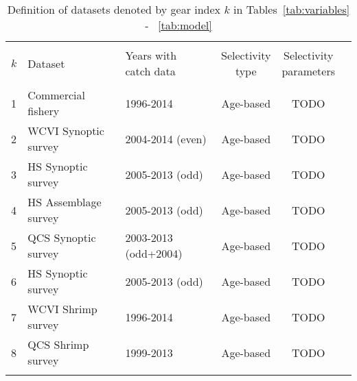 \newp
\begin{table}[b]
\centering
\caption{\label{tab:datasets} Definition of datasets denoted by gear index $k$ in Tables~\ref{tab:variables} - ~\ref{tab:model}}
\begin{tabular}{lllccc}
\hline \\
$k$  & Dataset & \specialcell{Years with\\catch data} & \specialcell{Selectivity\\type} & \specialcell{Selectivity\\parameters} \\   %
\hline \\
1 & Commercial fishery     & 1996-2014             & Age-based & TODO \\
2 & WCVI Synoptic survey   & 2004-2014 (even)      & Age-based & TODO \\
3 & HS Synoptic survey     & 2005-2013 (odd)       & Age-based & TODO \\
4 & HS Assemblage survey   & 2005-2013 (odd)       & Age-based & TODO \\
5 & QCS Synoptic survey    & 2003-2013 (odd+2004)  & Age-based & TODO \\
6 & HS Synoptic survey     & 2005-2013 (odd)       & Age-based & TODO \\
7 & WCVI Shrimp survey     & 1996-2014             & Age-based & TODO \\
8 & QCS Shrimp survey      & 1999-2013             & Age-based & TODO \\
\hline \\
\end{tabular}
\end{table}




